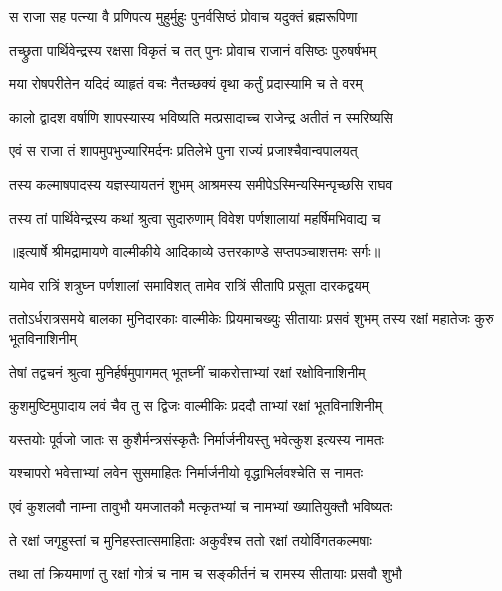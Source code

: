 \twolineshloka
{स राजा सह पत्न्या वै प्रणिपत्य मुहुर्मुहुः}
{पुनर्वसिष्ठं प्रोवाच यदुक्तं ब्रह्मरूपिणा} %

\twolineshloka
{तच्छ्रुता पार्थिवेन्द्रस्य रक्षसा विकृतं च तत्}
{पुनः प्रोवाच राजानं वसिष्ठः पुरुषर्षभम्} %

\twolineshloka
{मया रोषपरीतेन यदिदं व्याहृतं वचः}
{नैतच्छक्यं वृथा कर्तुं प्रदास्यामि च ते वरम्} %

\twolineshloka
{कालो द्वादश वर्षाणि शापस्यास्य भविष्यति}
{मत्प्रसादाच्च राजेन्द्र अतीतं न स्मरिष्यसि} %

\twolineshloka
{एवं स राजा तं शापमुपभुज्यारिमर्दनः}
{प्रतिलेभे पुना राज्यं प्रजाश्चैवान्वपालयत्} %

\twolineshloka
{तस्य कल्माषपादस्य यज्ञस्यायतनं शुभम्}
{आश्रमस्य समीपेऽस्मिन्यस्मिन्पृच्छसि राघव} %

\twolineshloka
{तस्य तां पार्थिवेन्द्रस्य कथां श्रुत्वा सुदारुणाम्}
{विवेश पर्णशालायां महर्षिमभिवाद्य च} %


{॥इत्यार्षे श्रीमद्रामायणे वाल्मीकीये आदिकाव्ये उत्तरकाण्डे सप्तपञ्चाशत्तमः सर्गः॥}


\twolineshloka
{यामेव रात्रिं शत्रुघ्न पर्णशालां समाविशत्}
{तामेव रात्रिं सीतापि प्रसूता दारकद्वयम्} %

\threelineshloka
{ततोऽर्धरात्रसमये बालका मुनिदारकाः}
{वाल्मीकेः प्रियमाचख्युः सीतायाः प्रसवं शुभम्}
{तस्य रक्षां महातेजः कुरु भूतविनाशिनीम्} %

\twolineshloka
{तेषां तद्वचनं श्रुत्वा मुनिर्हर्षमुपागमत्}
{भूतघ्नीं चाकरोत्ताभ्यां रक्षां रक्षोविनाशिनीम्} %

\twolineshloka
{कुशमुष्टिमुपादाय लवं चैव तु स द्विजः}
{वाल्मीकिः प्रददौ ताभ्यां रक्षां भूतविनाशिनीम्} %

\twolineshloka
{यस्तयोः पूर्वजो जातः स कुशैर्मन्त्रसंस्कृतैः}
{निर्मार्जनीयस्तु भवेत्कुश इत्यस्य नामतः} %

\twolineshloka
{यश्चापरो भवेत्ताभ्यां लवेन सुसमाहितः}
{निर्मार्जनीयो वृद्धाभिर्लवश्चेति स नामतः} %

\twolineshloka
{एवं कुशलवौ नाम्ना तावुभौ यमजातकौ}
{मत्कृतभ्यां च नामभ्यां ख्यातियुक्तौ भविष्यतः} %

\twolineshloka
{ते रक्षां जगृहुस्तां च मुनिहस्तात्समाहिताः}
{अकुर्वंश्च ततो रक्षां तयोर्विगतकल्मषाः} %

\twolineshloka
{तथा तां क्रियमाणां तु रक्षां गोत्रं च नाम च}
{सङ्कीर्तनं च रामस्य सीतायाः प्रसवौ शुभौ} %

